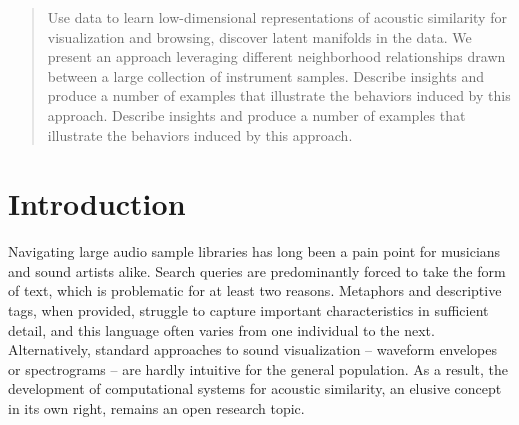 \documentclass{article}
\begin{document}

\begin{abstract}

Use data to learn low-dimensional representations of acoustic similarity for visualization and browsing, discover latent manifolds in the data.
We present an approach leveraging different neighborhood relationships drawn between a large collection of instrument samples.
Describe insights and produce a number of examples that illustrate the behaviors induced by this approach.
Describe insights and produce a number of examples that illustrate the behaviors induced by this approach.


\end{abstract}

\section{Introduction}
\label{submission}


Navigating large audio sample libraries has long been a pain point for musicians and sound artists alike.
Search queries are predominantly forced to take the form of text, which is problematic for at least two reasons.
Metaphors and descriptive tags, when provided, struggle to capture important characteristics in sufficient detail, and this language often varies from one individual to the next.
Alternatively, standard approaches to sound visualization -- waveform envelopes or spectrograms -- are hardly intuitive for the general population.
As a result, the development of computational systems for acoustic similarity, an elusive concept in its own right, remains an open research topic.
\end{document}
